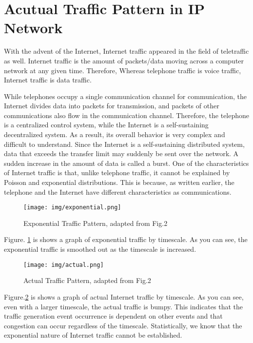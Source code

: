 \section{Acutual Traffic Pattern in IP Network}
With the advent of the Internet, Internet traffic appeared in the field of teletraffic as well.
Internet traffic is the amount of packets/data moving across a computer network at any given time.
Therefore, Whereas telephone traffic is voice traffic, Internet traffic is data traffic.

While telephones occupy a single communication channel for communication, the Internet divides data into packets for transmission, and packets of other communications also flow in the communication channel.
Therefore, the telephone is a centralized control system, while the Internet is a self-sustaining decentralized system. 
As a result, its overall behavior is very complex and difficult to understand.
Since the Internet is a self-sustaining distributed system, data that exceeds the transfer limit may suddenly be sent over the network. 
A sudden increase in the amount of data is called a burst.
One of the characteristics of Internet traffic is that, unlike telephone traffic, it cannot be explained by Poisson and exponential distributions\cite{Fukuda2004}.
This is because, as written earlier, the telephone and the Internet have different characteristics as communications.
  \begin{figure}[H]
    \centering
    \texttt{[image: img/exponential.png]}
    \caption{Exponential Traffic Pattern, adapted from \cite{Fukuda2004} Fig.2}
    \label{fig:exponential}  
  \end{figure}

Figure. \ref{fig:exponential} is shows a graph of exponential traffic by timescale.
As you can see, the exponential traffic is smoothed out as the timescale is increased.
  \begin{figure}[H]
    \centering
    \texttt{[image: img/actual.png]}
    \caption{Actual Traffic Pattern, adapted from \cite{Fukuda2004} Fig.2}
    \label{fig:actual}  
  \end{figure}

Figure.\ref{fig:actual} is shows a graph of actual Internet traffic by timescale.
As you can see, even with a larger timescale, the actual traffic is bumpy.
This indicates that the traffic generation event occurrence is dependent on other events and that congestion can occur regardless of the timescale.
Statistically, we know that the exponential nature of Internet traffic cannot be established\cite{leland1995self}\cite{paxson1995wide}.

